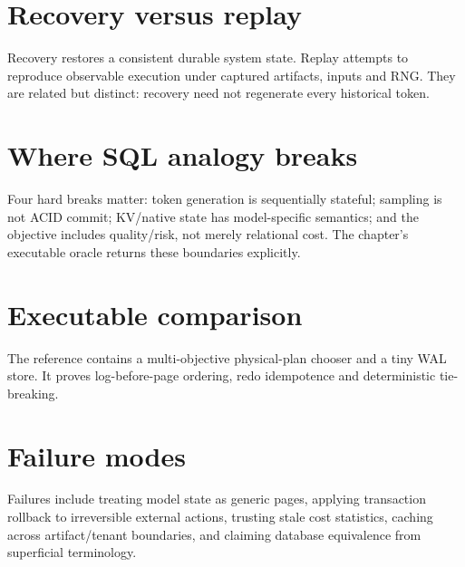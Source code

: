 \section{Recovery versus replay}
Recovery restores a consistent durable system state. Replay attempts to reproduce observable execution under captured artifacts, inputs and RNG. They are related but distinct: recovery need not regenerate every historical token.

\section{Where SQL analogy breaks}
Four hard breaks matter: token generation is sequentially stateful; sampling is not ACID commit; KV/native state has model-specific semantics; and the objective includes quality/risk, not merely relational cost. The chapter's executable oracle returns these boundaries explicitly.

\section{Executable comparison}
The reference contains a multi-objective physical-plan chooser and a tiny WAL store. It proves log-before-page ordering, redo idempotence and deterministic tie-breaking.

\section{Failure modes}
Failures include treating model state as generic pages, applying transaction rollback to irreversible external actions, trusting stale cost statistics, caching across artifact/tenant boundaries, and claiming database equivalence from superficial terminology.

